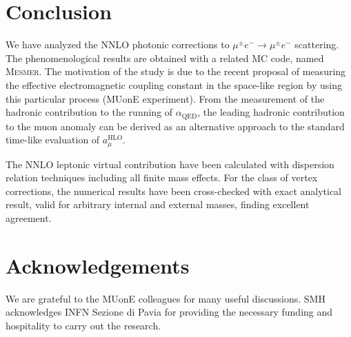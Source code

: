 \documentclass[Physsubmission, Phys]{SciPost}
\begin{document}
\section{Conclusion}
We have analyzed the NNLO photonic 
corrections to $\mu^\pm e^- \to \mu^\pm e^-$ scattering. The phenomenological results are obtained with a related MC code,
named \textsc{Mesmer}. 
The motivation of the study is due to the recent proposal of measuring the effective electromagnetic coupling constant in the space-like region by using this particular process
(MUonE experiment). From the measurement of the 
hadronic contribution to the running of $\alpha_\text{QED}$, the leading hadronic contribution to the muon anomaly 
can be derived as an alternative approach to 
the standard time-like evaluation of $a_\mu^\text{HLO}$.

The NNLO leptonic virtual contribution have been calculated with dispersion
relation techniques including all finite mass effects. For the class
of vertex corrections, the numerical results have been cross-checked
with exact analytical result, valid for arbitrary internal and
external masses, finding excellent agreement.


\section*{Acknowledgements}
We are grateful to the MUonE colleagues for many useful discussions. SMH acknowledges INFN Sezione di Pavia for providing the necessary funding and hospitality to carry out the research. 








\nolinenumbers
\end{document}
